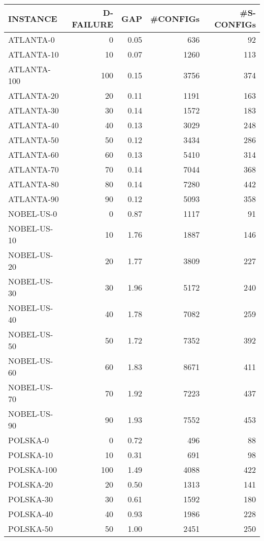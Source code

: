 \begin{table}[h]
\centering
\begin{tabular}{|l|r|r|r|r|}
\toprule
\hline INSTANCE & D-FAILURE & GAP & \#CONFIGs & \#S-CONFIGs \\
\midrule
\hline ATLANTA-0    & 0   & 0.05 & 636  & 92  \\
\hline ATLANTA-10   & 10  & 0.07 & 1260 & 113 \\
\hline ATLANTA-100  & 100 & 0.15 & 3756 & 374 \\
\hline ATLANTA-20   & 20  & 0.11 & 1191 & 163 \\
\hline ATLANTA-30   & 30  & 0.14 & 1572 & 183 \\
\hline ATLANTA-40   & 40  & 0.13 & 3029 & 248 \\
\hline ATLANTA-50   & 50  & 0.12 & 3434 & 286 \\
\hline ATLANTA-60   & 60  & 0.13 & 5410 & 314 \\
\hline ATLANTA-70   & 70  & 0.14 & 7044 & 368 \\
\hline ATLANTA-80   & 80  & 0.14 & 7280 & 442 \\
\hline ATLANTA-90   & 90  & 0.12 & 5093 & 358 \\
\hline NOBEL-US-0   & 0   & 0.87 & 1117 & 91  \\
\hline NOBEL-US-10  & 10  & 1.76 & 1887 & 146 \\
\hline NOBEL-US-20  & 20  & 1.77 & 3809 & 227 \\
\hline NOBEL-US-30  & 30  & 1.96 & 5172 & 240 \\
\hline NOBEL-US-40  & 40  & 1.78 & 7082 & 259 \\
\hline NOBEL-US-50  & 50  & 1.72 & 7352 & 392 \\
\hline NOBEL-US-60  & 60  & 1.83 & 8671 & 411 \\
\hline NOBEL-US-70  & 70  & 1.92 & 7223 & 437 \\
\hline NOBEL-US-90  & 90  & 1.93 & 7552 & 453 \\
\hline POLSKA-0     & 0   & 0.72 & 496  & 88  \\
\hline POLSKA-10    & 10  & 0.31 & 691  & 98  \\
\hline POLSKA-100   & 100 & 1.49 & 4088 & 422 \\
\hline POLSKA-20    & 20  & 0.50 & 1313 & 141 \\
\hline POLSKA-30    & 30  & 0.61 & 1592 & 180 \\
\hline POLSKA-40    & 40  & 0.93 & 1986 & 228 \\
\hline POLSKA-50    & 50  & 1.00 & 2451 & 250 \\

\end{tabular}
\end{table}
